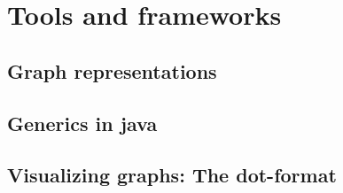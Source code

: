 \documentclass[thesis.tex]{subfiles}
\begin{document}
\section{Tools and frameworks}
\subsection{Graph representations}
\subsection{Generics in java}
\subsection{Visualizing graphs: The dot-format}
\end{document}
